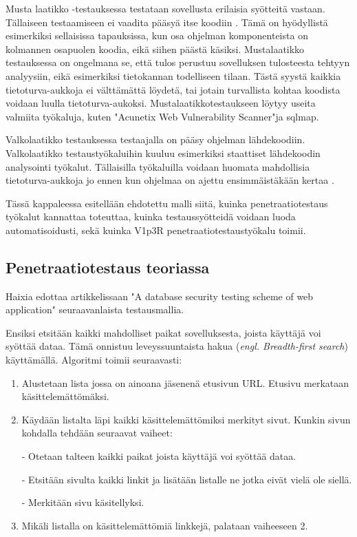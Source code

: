 \documentclass[finnish]{tktltiki2}
\theoremstyle{definition}
\theoremstyle{remark}
\begin{document}
	Musta laatikko -testauksessa testataan sovellusta erilaisia syötteitä vastaan. Tällaiseen testaamiseen ei vaadita pääsyä itse koodiin \cite{testing2}. Tämä on hyödyllistä esimerkiksi sellaisissa tapauksissa, kun osa ohjelman komponenteista on kolmannen osapuolen koodia, eikä siihen päästä käsiksi. Mustalaatikko testauksessa on ongelmana se, että tulos perustuu sovelluksen tulosteesta tehtyyn analyysiin, eikä esimerkiksi tietokannan todelliseen tilaan. Tästä syystä kaikkia tietoturva-aukkoja ei välttämättä löydetä, tai jotain turvallista kohtaa koodista voidaan luulla tietoturva-aukoksi. Mustalaatikkotestaukseen löytyy useita valmiita työkaluja, kuten "Acunetix Web Vulnerability Scanner"\space ja sqlmap.
	
	Valkolaatikko testauksessa testaajalla on pääsy ohjelman lähdekoodiin. Valkolaatikko testaustyökaluihin kuuluu esimerkiksi staattiset lähdekoodin analysointi työkalut. Tällaisilla työkaluilla voidaan huomata mahdollisia tietoturva-aukkoja jo ennen kun ohjelmaa on ajettu ensimmäistäkään kertaa \cite{valkolaatikko}.
	
	Tässä kappaleessa esitellään ehdotettu malli siitä, kuinka penetraatiotestaus työkalut kannattaa toteuttaa, kuinka testaussyötteidä voidaan luoda automatisoidusti, sekä kuinka V1p3R penetraatiotestaustyökalu toimii.
	
	\subsection{Penetraatiotestaus teoriassa}
	 Haixia edottaa artikkelissaan "A database security testing scheme of web application"\space\cite{testing} seuraavanlaista testausmallia.
	
	Ensiksi etsitään kaikki mahdolliset paikat sovelluksesta, joista käyttäjä voi syöttää dataa. Tämä onnistuu leveyssuuntaista hakua (\textit{engl. Breadth-first search}) käyttämällä. Algoritmi toimii seuraavasti:
	\begin{enumerate}
		\item Alustetaan lista jossa on ainoana jäsenenä etusivun URL. Etusivu merkataan käsittelemättömäksi.
		
		\item Käydään listalta läpi kaikki käsittelemättömiksi merkityt sivut. Kunkin sivun kohdalla tehdään seuraavat vaiheet:
		
		- Otetaan talteen kaikki paikat joista käyttäjä voi syöttää dataa.
		
		- Etsitään sivulta kaikki linkit ja lisätään listalle ne jotka eivät vielä ole siellä.
		
		- Merkitään sivu käsitellyksi.
		
		\item Mikäli listalla on käsittelemättömiä linkkejä, palataan vaiheeseen 2.
	\end{enumerate}
	
\end{document}
